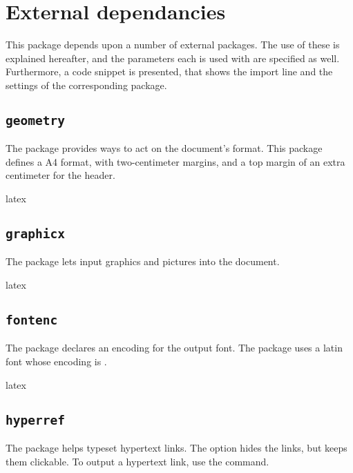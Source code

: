 \documentclass{report}
\begin{document}
\section{External dependancies}
This package depends upon a number of external packages.
The use of these is explained hereafter, and the parameters each is used with are specified as well.
Furthermore, a code snippet is presented, that shows the import line and the settings of the corresponding package.


\subsection{\texttt{geometry}}
The  package provides ways to act on the document's format.
This package defines a A4 format, with two-centimeter margins, and a top margin of an extra centimeter for the header.

\begin{imtaCode}{latex}
\RequirePackage[a4paper, margin=2cm, top=3cm]{geometry}
\end{imtaCode}


\subsection{\texttt{graphicx}}
The  package lets input graphics and pictures into the document.

\begin{imtaCode}{latex}
\RequirePackage{graphicx}
\end{imtaCode}


\subsection{\texttt{fontenc}}
The  package declares an encoding for the output font.
The  package uses a latin font whose encoding is .

\begin{imtaCode}{latex}
\RequirePackage[T1]{fontenc}
\end{imtaCode}


\subsection{\texttt{hyperref}}
The  package helps typeset hypertext links.
The  option hides the links, but keeps them clickable.
To output a hypertext link, use the  command.
\end{document}
